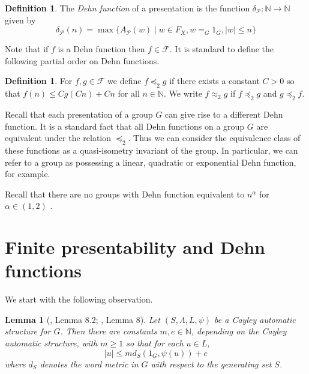 \documentclass[11pt]{amsart}
\newcommand{\preceqD}{\preceq_2}
\newcommand{\approxD}{\approx_2}
\newtheorem{lemma}[theorem]{Lemma}
\theoremstyle{definition}
\newtheorem{definition}[theorem]{Definition}
\newcommand\N{\mathbb N}
\newcommand\F{\mathcal F}
\renewcommand{\geq}{\geqslant} \renewcommand{\leq}{\leqslant} \renewcommand{\ge}{\geqslant} \renewcommand{\le}{\leqslant}
\begin{document}
\begin{definition}
The {\em Dehn function} of a presentation is the function  $\delta_{\mathcal P}:\N\to\N$ given by
$$
\delta_{\mathcal P}(n)=\max\{A_{\mathcal P}(w)\mid  w\in F_X, w=_G1_G, |w|\le n \}
$$
\end{definition}

Note that if $f$ is a Dehn function then $f\in \F$.
It is standard to define the following partial order on Dehn functions.

\begin{definition}\label{def:dehn_equiv}
For $f,g \in \F$ we define $f \preceqD g$ if there exists a constant $C>0$ so that $f(n)\le Cg(Cn)+Cn$ for all $n\in\N$.
We write $f \approxD g$ if  $f \preceqD g$ and $g \preceqD f$.
\end{definition}

Recall that each presentation of a group $G$ can give rise to a different Dehn function.
It is a standard fact
that all Dehn functions on a group $G$ are equivalent under the relation $\preceqD$.  Thus we can
consider the equivalence class of these functions as a quasi-isometry invariant of the group.  In particular,   we can refer to a group as possessing a linear, quadratic or exponential Dehn function, for example.


Recall that
there are no groups with Dehn function equivalent to $n^\alpha$ for $\alpha \in (1,2)$ \cite{Bowditch,GromovHyp, Olshanskii}.




 \section{Finite presentability and Dehn functions}



We start with the following observation.
\begin{lemma}[\cite{KKMjournal}, Lemma 8.2; \cite{cga}, Lemma 8]\label{lem:bound1}
Let $(S,\Lambda,L,\psi)$ be a  Cayley automatic structure  for $G$. Then there are constants $m,e\in \N$, depending on the Cayley automatic structure, with $m\geq 1$ so that for each $u \in L$,
\[|u| \leq m d_S(1_G, \psi(u)) + e\]
where $d_S$ denotes the word metric in $G$ with respect to the generating set $S$.
\end{lemma}
\end{document}
